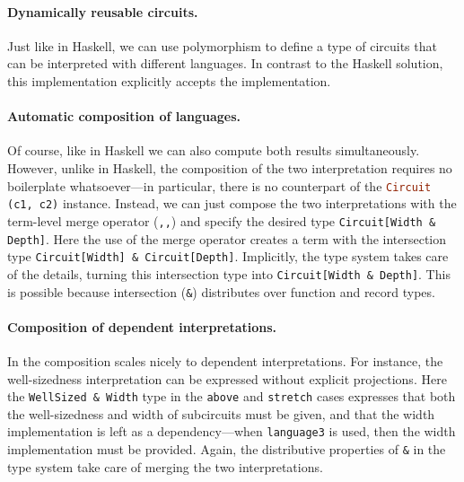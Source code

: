 \paragraph{Dynamically reusable circuits.}

Just like in Haskell, we can use polymorphism to define a type
of circuits that can be interpreted with different languages.
In contrast to the Haskell solution, this implementation explicitly accepts
the implementation.

\paragraph{Automatic composition of languages.}

Of course, like in Haskell we can also compute both results simultaneously.
However, unlike in Haskell, the composition of the two interpretation requires
no boilerplate whatsoever---in particular, there is no \sedel counterpart of the
\lstinline[language=haskell]{Circuit (c1, c2)} instance. Instead, we can just compose the two interpretations
with the term-level merge operator (\lstinline{,,}) and specify the desired type \lstinline{Circuit[Width & Depth]}.
Here the use of the merge operator creates a term with the intersection type
\lstinline{Circuit[Width] & Circuit[Depth]}. Implicitly, the \sedel type system
takes care of the details, turning this intersection type into
\lstinline{Circuit[Width & Depth]}. This is possible because intersection (\lstinline{&}) distributes over function and record types.

\paragraph{Composition of dependent interpretations.}

In \sedel the composition scales nicely to dependent interpretations.
For instance, the well-sizedness interpretation can be expressed without
explicit projections.
Here the \lstinline{WellSized & Width} type in the \lstinline{above} and \lstinline{stretch} cases
expresses that both the well-sizedness and width of subcircuits must be given,
and that the width implementation is left as a dependency---when \lstinline{language3} is used,
then the width implementation must be provided.
Again, the distributive properties of \lstinline{&} in the type system take care of
merging the two interpretations.

